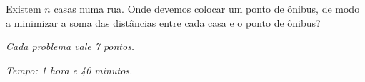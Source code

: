 \documentclass[12pt, a4paper]{article}
\newcommand{\rulesep}{
	\vspace{4mm}

}
\begin{document}
	\pagestyle{empty}
	
	\contesttitle
	
	\rulesep
	
	
	\rulesep

	\begin{prob}
		Existem $n$ casas numa rua. Onde devemos colocar um ponto de ônibus, de modo a minimizar a soma das distâncias entre cada casa e o ponto de ônibus?
	\end{prob}

	\rulesep

	
	\rulesep


	\vfill

	{\hfill \slshape Cada problema vale 7 pontos.}

	{\hfill \slshape Tempo: 1 hora e 40 minutos.}
\end{document}
